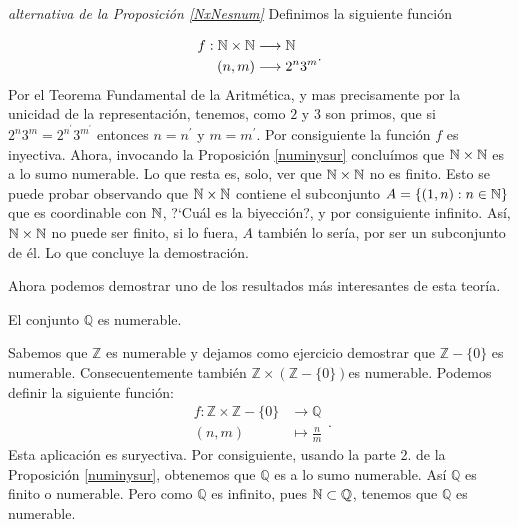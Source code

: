 \begin{demo} \emph{alternativa de la Proposición \ref{NxNesnum}}
Definimos la siguiente función

\[\begin{split}
f:\mathbb{N}\times\mathbb{N}&\longrightarrow\mathbb{N}\\
 (n,m)&\longrightarrow 2^n3^m\\
 \end{split}.
 \]
Por el Teorema Fundamental de la Aritmética, y mas precisamente
por la unicidad de la representación, tenemos, como $2$ y $3$
son primos, que si $2^n3^m=2^{n^{\prime}}3^{m^{\prime}}$ entonces
$n=n^{\prime}$ y $m=m^{\prime}$. Por consiguiente la función $f$
es inyectiva. Ahora, invocando la Proposición \vref{numinysur}
concluímos que $\mathbb{N}\times\mathbb{N}$ es a lo sumo numerable. Lo que
resta es, solo, ver que $\mathbb{N}\times\mathbb{N}$ no es finito. Esto se puede
probar observando que $\mathbb{N}\times\mathbb{N}$ contiene el subconjunto
$A=\{(1,n):n\in\mathbb{N}\}$ que es coordinable con $\mathbb{N}$, ?`Cuál es la
biyección?, y por consiguiente infinito. Así,
$\mathbb{N}\times\mathbb{N}$ no puede ser finito, si lo fuera, $A$ también lo
sería, por ser un subconjunto de él. Lo que concluye la
demostración.
\end{demo}

Ahora podemos demostrar  uno de los resultados más interesantes
de esta teoría.
\begin{teorema}{} El conjunto $\mathbb{Q}$ es numerable.
\end{teorema}
\begin{demo} Sabemos que $\mathbb{Z}$ es numerable y dejamos como ejercicio demostrar que $\mathbb{Z}-\{0\}$ es numerable. Consecuentemente también  $\mathbb{Z}\times\left(\mathbb{Z}-\{0\}\right) $es numerable. Podemos
definir la siguiente función:
\[
\begin{split}
f:\mathbb{Z}\times\mathbb{Z}-\{0\}&\longrightarrow\mathbb{Q}\\
(n,m)&\longmapsto \frac{n}{m}
\end{split}
.\] Esta aplicación es suryectiva. Por consiguiente, usando la
parte 2. de la Proposición \vref{numinysur}, obtenemos que
$\mathbb{Q}$ es a lo sumo numerable. Así $\mathbb{Q}$ es
finito o numerable. Pero como $\mathbb{Q}$ es infinito, pues
$\mathbb{N}\subset\mathbb{Q}$, tenemos que $\mathbb{Q}$ es numerable. \end{demo}


